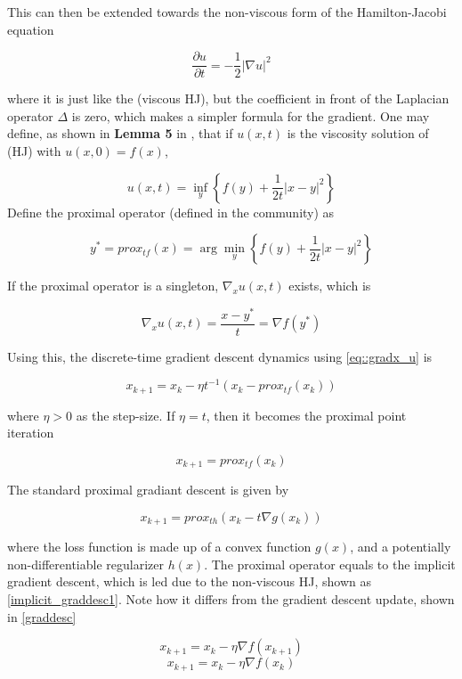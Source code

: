 This can then be extended towards the non-viscous form of the Hamilton-Jacobi equation

\begin{equation*}
    \frac{\partial u}{\partial t} = - \frac{1}{2} | \nabla u |^2 \tag{non-viscous HJ}
\end{equation*}

where it is just like the (viscous HJ), but the coefficient in front of the Laplacian operator $\Delta$ is zero, which makes a simpler formula for the gradient. One may define, as shown in \textbf{Lemma 5} in \cite{deeprelaxation}, that if $u(x,t)$ is the viscosity solution of (HJ) with $u(x,0) = f(x)$,

\begin{equation}
    u(x,t) = \inf_y \left\{ f(y) + \frac{1}{2t} |x-y|^2 \right\} \tag{HL}
\end{equation}
Define the proximal operator (defined in the community) as

\begin{equation*}
    y^* = prox_{tf}(x) = \arg \min_y \left\{ f(y) + \frac{1}{2t} |x-y| ^2 \right\}
\end{equation*}

If the proximal operator is a singleton, $\nabla_x u(x,t)$ exists, which is

\begin{equation} \label{eq::gradx_u}
        \nabla_x u(x,t) = \frac{x-y^*}{t} = \nabla f(y^*)
\end{equation}

Using this, the discrete-time gradient descent dynamics using \ref{eq::gradx_u} is

$$x_{k+1} = x_k - \eta t^{-1} (x_k - prox_{tf}(x_k))$$

where $\eta > 0$ as the step-size. If $\eta = t$, then it becomes the proximal point iteration

$$x_{k+1} = prox_{tf}(x_k)$$

The standard proximal gradiant descent is given by

$$x_{k+1} = prox_{th}(x_k - t \nabla g(x_k))$$

where the loss function is made up of a convex function $g(x)$, and a potentially non-differentiable regularizer $h(x)$. The proximal operator equals to the implicit gradient descent, which is led due to the non-viscous HJ, shown as \ref{implicit_graddesc1}. Note how it differs from the gradient descent update, shown in \ref{graddesc}

\begin{equation}
    x_{k+1} = x_k - \eta \nabla f(x_{k+1}) \label{implicit_graddesc1}
\end{equation}
\begin{equation}
    x_{k+1} = x_k - \eta \nabla f(x_k)  \label{graddesc}
\end{equation}
